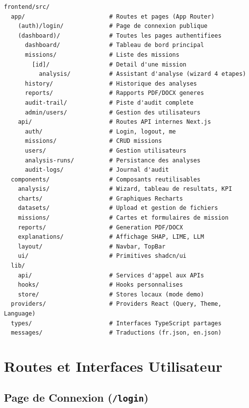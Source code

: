 \begin{lstlisting}[caption={Structure des dossiers du frontend}, label={lst:frontend-structure}]
frontend/src/
  app/                        # Routes et pages (App Router)
    (auth)/login/             # Page de connexion publique
    (dashboard)/              # Toutes les pages authentifiees
      dashboard/              # Tableau de bord principal
      missions/               # Liste des missions
        [id]/                 # Detail d'une mission
          analysis/           # Assistant d'analyse (wizard 4 etapes)
      history/                # Historique des analyses
      reports/                # Rapports PDF/DOCX generes
      audit-trail/            # Piste d'audit complete
      admin/users/            # Gestion des utilisateurs
    api/                      # Routes API internes Next.js
      auth/                   # Login, logout, me
      missions/               # CRUD missions
      users/                  # Gestion utilisateurs
      analysis-runs/          # Persistance des analyses
      audit-logs/             # Journal d'audit
  components/                 # Composants reutilisables
    analysis/                 # Wizard, tableau de resultats, KPI
    charts/                   # Graphiques Recharts
    datasets/                 # Upload et gestion de fichiers
    missions/                 # Cartes et formulaires de mission
    reports/                  # Generation PDF/DOCX
    explanations/             # Affichage SHAP, LIME, LLM
    layout/                   # Navbar, TopBar
    ui/                       # Primitives shadcn/ui
  lib/
    api/                      # Services d'appel aux APIs
    hooks/                    # Hooks personnalises
    store/                    # Stores locaux (mode demo)
  providers/                  # Providers React (Query, Theme, Language)
  types/                      # Interfaces TypeScript partages
  messages/                   # Traductions (fr.json, en.json)
\end{lstlisting}

\section{Routes et Interfaces Utilisateur}

\subsection{Page de Connexion (\texttt{/login})}

